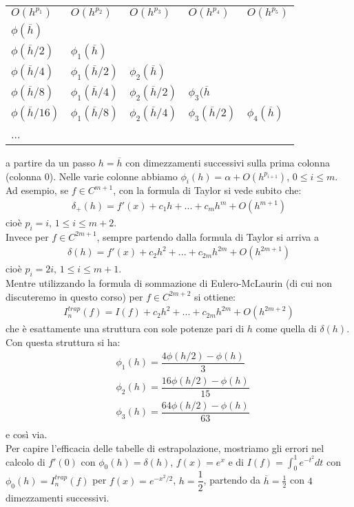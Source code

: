 \documentclass[12pt,a4paper]{article}
\begin{document}
\begin{table}[H]
\centering
\begin{tabular}{lllll}
$O(h^{p_{1}})$ & $O(h^{p_{2}})$ & $O(h^{p_{3}})$ & $O(h^{p_{4}})$ & $O(h^{p_{5}})$ \\  \cline{1-5} 

$\phi(\overline{h})$\\ 

$\phi (\overline{h}/2)$ & $\phi_1 (\overline{h})$\\

 $\phi (\overline{h}/4)$ & $\phi_1 (\overline{h}/2)$ & $\phi_2 (\overline{h})$\\
 $\phi (\overline{h}/8)$ & $\phi_1 (\overline{h}/4)$ & $\phi_2 (\overline{h}/2)$ & $\phi_3 (\overline{h}$\\
$\phi (\overline{h}/16)$ & $\phi_1 (\overline{h}/8)$ & $\phi_2 (\overline{h}/4)$ & $\phi_3 (\overline{h}/2)$ & $\phi_4 (\overline{h})$\\
	... 

\end{tabular}
\end{table}


a partire da un passo $h=\overline{h}$ con dimezzamenti successivi sulla prima colonna (colonna $0$). Nelle varie colonne abbiamo $\phi_i(h)=\alpha + O(h^{p_{i+1}})$, $0\leq i \leq m$.
Ad esempio, se $f \in C^{m+1}$, con la formula di Taylor si vede subito che:
\[ \begin{split}
	\delta_+ (h)=f'(x)+c_1h+...+c_mh^m+O(h^{m+1})
\end{split} \]
cioè $p_i=i, \, 1 \leq i \leq m+2$.\\
Invece per $f \in C^{2m+1}$, sempre partendo dalla formula di Taylor si arriva a 
\[ \begin{split}
	\delta (h)=f'(x)+c_2h^2+...+c_{2m}h^{2m}+O(h^{2m+1})
\end{split} \]
cioè $p_i=2i, \, 1 \leq i \leq m+1$.\\
Mentre utilizzando la formula di sommazione di Eulero-McLaurin (di cui non discuteremo in questo corso) per $f \in C^{2m+2}$ si ottiene:
\[ \begin{split}
	I_n^{trap} (f)=I(f)+c_2h^2+...+c_{2m}h^{2m}+O(h^{2m+2})
\end{split} \]
che è esattamente una struttura con sole potenze pari di $h$ come quella di $\delta(h)$. Con questa struttura si ha:
\[ \begin{split}
	& \phi_1(h)=\dfrac{4 \phi(h/2)-\phi(h)}{3}\\
	& \phi_2(h)=\dfrac{16 \phi(h/2)-\phi(h)}{15}\\
	& \phi_3(h)=\dfrac{64 \phi(h/2)-\phi(h)}{63}\\
\end{split} \]
e così via.\\
Per capire l'efficacia delle tabelle di estrapolazione, mostriamo gli errori nel calcolo di $f'(0)$ con $\phi_0(h)=\delta (h)$, $f(x)=e^x$ e di $I(f)=\int_0^1 e^{-t^2} dt$ con $\phi_0(h)=I_n^{trap} (f)$ per $f(x)=e^{-x^2/2}$, $h=\dfrac{1}{2}$, partendo da $\overline{h}=\frac{1}{2}$ con $4$ dimezzamenti successivi.
\\
\end{document}
